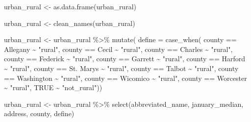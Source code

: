 \documentclass[
  letterpaper,
  DIV=11,
  numbers=noendperiod]{scrartcl}
\newenvironment{Shaded}{\begin{snugshade}}{\end{snugshade}}
\newcommand{\AttributeTok}[1]{\textcolor[rgb]{0.40,0.45,0.13}{#1}}
\newcommand{\ConstantTok}[1]{\textcolor[rgb]{0.56,0.35,0.01}{#1}}
\newcommand{\FunctionTok}[1]{\textcolor[rgb]{0.28,0.35,0.67}{#1}}
\newcommand{\NormalTok}[1]{\textcolor[rgb]{0.00,0.23,0.31}{#1}}
\newcommand{\OtherTok}[1]{\textcolor[rgb]{0.00,0.23,0.31}{#1}}
\newcommand{\SpecialCharTok}[1]{\textcolor[rgb]{0.37,0.37,0.37}{#1}}
\newcommand{\StringTok}[1]{\textcolor[rgb]{0.13,0.47,0.30}{#1}}
\begin{document}
\begin{Shaded}
\begin{Highlighting}[]
\NormalTok{urban\_rural }\OtherTok{\textless{}{-}} \FunctionTok{as.data.frame}\NormalTok{(urban\_rural)}

\NormalTok{urban\_rural }\OtherTok{\textless{}{-}} \FunctionTok{clean\_names}\NormalTok{(urban\_rural)}


\NormalTok{urban\_rural }\OtherTok{\textless{}{-}}\NormalTok{ urban\_rural }\SpecialCharTok{\%\textgreater{}\%} 
  \FunctionTok{mutate}\NormalTok{(}
  \AttributeTok{define =} \FunctionTok{case\_when}\NormalTok{(}
\NormalTok{   county }\SpecialCharTok{==} \StringTok{\textquotesingle{}Allegany\textquotesingle{}}  \SpecialCharTok{\textasciitilde{}} \StringTok{"rural"}\NormalTok{,}
\NormalTok{   county }\SpecialCharTok{==} \StringTok{\textquotesingle{}Cecil\textquotesingle{}} \SpecialCharTok{\textasciitilde{}} \StringTok{"rural"}\NormalTok{,}
\NormalTok{   county }\SpecialCharTok{==} \StringTok{\textquotesingle{}Charles\textquotesingle{}}  \SpecialCharTok{\textasciitilde{}} \StringTok{"rural"}\NormalTok{,}
\NormalTok{   county }\SpecialCharTok{==} \StringTok{\textquotesingle{}Federick\textquotesingle{}}  \SpecialCharTok{\textasciitilde{}} \StringTok{"rural"}\NormalTok{,}
\NormalTok{   county }\SpecialCharTok{==} \StringTok{\textquotesingle{}Garrett\textquotesingle{}} \SpecialCharTok{\textasciitilde{}} \StringTok{"rural"}\NormalTok{,}
\NormalTok{   county }\SpecialCharTok{==} \StringTok{\textquotesingle{}Harford\textquotesingle{}}  \SpecialCharTok{\textasciitilde{}} \StringTok{"rural"}\NormalTok{,}
\NormalTok{   county }\SpecialCharTok{==} \StringTok{\textquotesingle{}St. Marys\textquotesingle{}}  \SpecialCharTok{\textasciitilde{}} \StringTok{"rural"}\NormalTok{,}
\NormalTok{   county }\SpecialCharTok{==} \StringTok{\textquotesingle{}Talbot\textquotesingle{}} \SpecialCharTok{\textasciitilde{}} \StringTok{"rural"}\NormalTok{,}
\NormalTok{   county }\SpecialCharTok{==} \StringTok{\textquotesingle{}Washington\textquotesingle{}}  \SpecialCharTok{\textasciitilde{}} \StringTok{"rural"}\NormalTok{,}
\NormalTok{   county }\SpecialCharTok{==} \StringTok{\textquotesingle{}Wicomico\textquotesingle{}} \SpecialCharTok{\textasciitilde{}} \StringTok{"rural"}\NormalTok{,}
\NormalTok{   county }\SpecialCharTok{==} \StringTok{\textquotesingle{}Worcester\textquotesingle{}}  \SpecialCharTok{\textasciitilde{}} \StringTok{"rural"}\NormalTok{,}
   \ConstantTok{TRUE} \SpecialCharTok{\textasciitilde{}} \StringTok{"not\_rural"}\NormalTok{))}

\NormalTok{urban\_rural }\OtherTok{\textless{}{-}}\NormalTok{ urban\_rural }\SpecialCharTok{\%\textgreater{}\%} 
  \FunctionTok{select}\NormalTok{(abbreviated\_name, january\_median, address, county, define)}
\end{Highlighting}
\end{Shaded}
\end{document}
